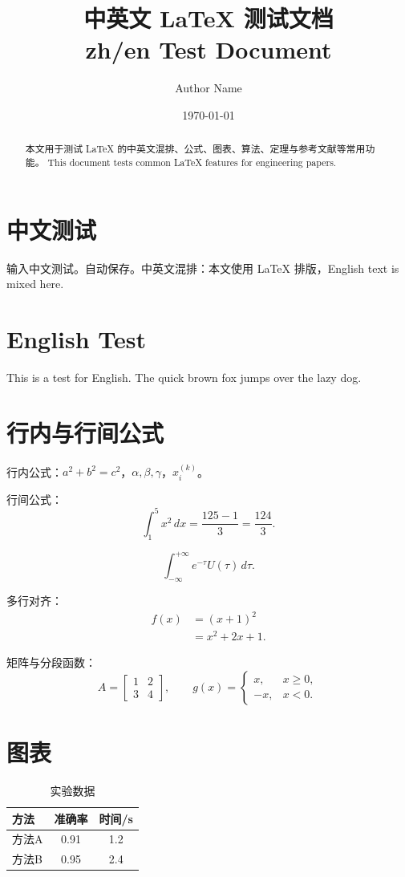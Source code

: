 \documentclass{ctexart}
\title{中英文 \LaTeX{} 测试文档\\zh/en Test Document}
\author{Author Name}
\date{\today}
\begin{document}
\maketitle

\begin{abstract}
本文用于测试 \LaTeX{} 的中英文混排、公式、图表、算法、定理与参考文献等常用功能。
This document tests common \LaTeX{} features for engineering papers.
\end{abstract}

\section{中文测试}
输入中文测试。自动保存。中英文混排：本文使用 \LaTeX{} 排版，English text is mixed here.

\section{English Test}
This is a test for English. The quick brown fox jumps over the lazy dog.

\section{行内与行间公式}
行内公式：$a^2+b^2=c^2$，$\alpha,\beta,\gamma$，$x_i^{(k)}$。

行间公式：
\begin{equation}
\label{eq:integral}
\int_{1}^{5} x^2 \,dx = \frac{125-1}{3} = \frac{124}{3}.
\end{equation}

\begin{equation}
\label{eq:conv}
\int_{-\infty}^{+\infty} e^{-\tau} U(\tau) \,d\tau.
\end{equation}

多行对齐：
\begin{align}
f(x) &= (x+1)^2 \nonumber\\
     &= x^2 + 2x + 1.
\end{align}

矩阵与分段函数：
\[
A=\begin{bmatrix}
1 & 2\\
3 & 4
\end{bmatrix},\qquad
g(x)=
\begin{cases}
x, & x\ge 0,\\
-x, & x<0.
\end{cases}
\]

\section{图表}
\begin{table}[htbp]
\centering
\caption{实验数据}
\label{tab:data}
\begin{tabular}{lcc}
\toprule
方法 & 准确率 & 时间/s\\
\midrule
方法A & 0.91 & 1.2\\
方法B & 0.95 & 2.4\\
\bottomrule
\end{tabular}
\end{table}
\end{document}
